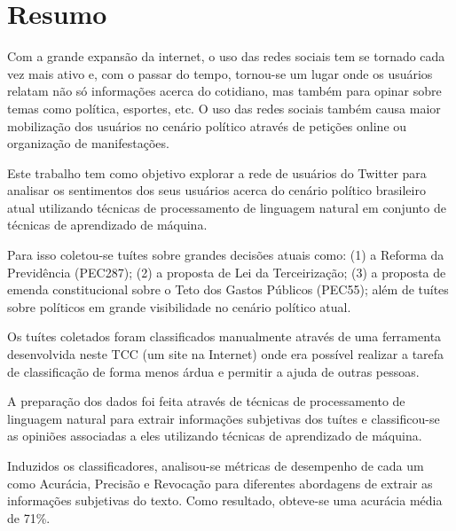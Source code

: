 \chapter*{Resumo}

Com a grande expansão da internet, o uso das redes sociais tem se
tornado cada vez mais ativo e, com o passar do tempo, tornou-se um
lugar onde os usuários relatam não só informações acerca do cotidiano,
mas também para opinar sobre temas como política, esportes, etc. O uso
 das redes sociais também causa maior mobilização dos usuários no
cenário político através de petições online ou organização de
manifestações.

Este trabalho tem como objetivo explorar a rede de usuários do Twitter
para analisar os sentimentos dos seus usuários acerca do cenário
político brasileiro atual utilizando técnicas de processamento de
linguagem natural em conjunto de técnicas de aprendizado de máquina.

Para isso coletou-se tuítes sobre grandes decisões atuais como: (1) a
Reforma da Previdência (PEC287); (2) a proposta de Lei da
Terceirização; (3) a proposta de emenda constitucional sobre o Teto
dos Gastos Públicos (PEC55); além de tuítes sobre políticos em grande
visibilidade no cenário político atual.

Os tuítes coletados foram classificados manualmente através de uma
ferramenta desenvolvida neste TCC (um site na Internet) onde era
possível realizar a tarefa de classificação de forma menos árdua e
permitir a ajuda de outras pessoas.

A preparação dos dados foi feita através de técnicas de processamento
de linguagem natural para extrair informações subjetivas dos tuítes e
classificou-se as opiniões associadas a eles utilizando técnicas de
aprendizado de máquina.

Induzidos os classificadores, analisou-se métricas de desempenho de
cada um como Acurácia, Precisão e Revocação para diferentes abordagens
de extrair as informações subjetivas do texto.
Como resultado, obteve-se uma acurácia média de 71\%.

